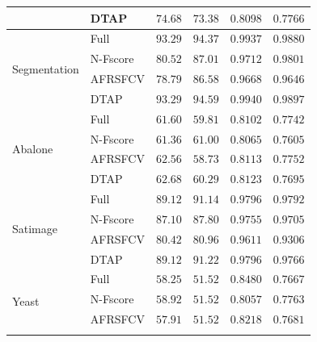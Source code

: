\documentclass[]{interact}
\theoremstyle{plain}
\theoremstyle{definition}
\theoremstyle{remark}
\begin{document}
{\begin{longtable}{ll rr rr}
                              & DTAP     & $\mathbf{74.68}$ & $\mathbf{73.38}$ & $\mathbf{0.8098}$ & $\mathbf{0.7766}$ \\
\midrule
\multirow{4}{*}{Segmentation} & Full     & $93.29$          & $94.37$          & $0.9937$          & $0.9880$          \\*
                              & N-Fscore & $80.52$          & $87.01$          & $0.9712$          & $0.9801$          \\*
                              & AFRSFCV  & $78.79$          & $86.58$          & $0.9668$          & $0.9646$          \\*
                              & DTAP     & $\mathbf{93.29}$ & $\mathbf{94.59}$ & $\mathbf{0.9940}$ & $\mathbf{0.9897}$ \\
\midrule
\multirow{4}{*}{Abalone}      & Full     & $61.60$          & $59.81$          & $0.8102$          & $0.7742$          \\*
                              & N-Fscore & $61.36$          & $\mathbf{61.00}$ & $0.8065$          & $0.7605$          \\*
                              & AFRSFCV  & $62.56$          & $58.73$          & $0.8113$          & $\mathbf{0.7752}$ \\*
                              & DTAP     & $\mathbf{62.68}$ & $60.29$          & $\mathbf{0.8123}$ & $0.7695$          \\
\midrule
\multirow{4}{*}{Satimage}     & Full     & $89.12$          & $91.14$          & $0.9796$          & $0.9792$          \\*
                              & N-Fscore & $87.10$          & $87.80$          & $0.9755$          & $0.9705$          \\*
                              & AFRSFCV  & $80.42$          & $80.96$          & $0.9611$          & $0.9306$          \\*
                              & DTAP     & $\mathbf{89.12}$ & $\mathbf{91.22}$ & $\mathbf{0.9796}$ & $\mathbf{0.9766}$ \\
\midrule
\multirow{4}{*}{Yeast}        & Full     & $58.25$          & $51.52$          & $0.8480$          & $0.7667$          \\*
                              & N-Fscore & $\mathbf{58.92}$ & $\mathbf{51.52}$ & $0.8057$          & $\mathbf{0.7763}$ \\*
                              & AFRSFCV  & $57.91$          & $\mathbf{51.52}$ & $0.8218$          & $0.7681$          \\*

\end{longtable}}
\end{document}
